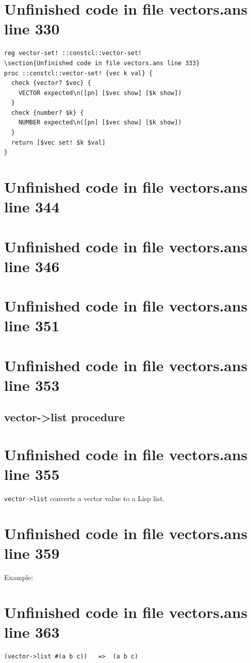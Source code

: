 \documentclass[twoside,9pt]{report}
\begin{document}
\section{Unfinished code in file vectors.ans line 330}
\begin{lstlisting}
reg vector-set! ::constcl::vector-set!
\section{Unfinished code in file vectors.ans line 333}
proc ::constcl::vector-set! {vec k val} {
  check {vector? $vec} {
    VECTOR expected\n([pn] [$vec show] [$k show])
  }
  check {number? $k} {
    NUMBER expected\n([pn] [$vec show] [$k show])
  }
  return [$vec set! $k $val]
}
\end{lstlisting}
\section{Unfinished code in file vectors.ans line 344}
\section{Unfinished code in file vectors.ans line 346}
\section{Unfinished code in file vectors.ans line 351}
\section{Unfinished code in file vectors.ans line 353}
\subsection{vector->list procedure}
\label{vector->list-procedure}
\section{Unfinished code in file vectors.ans line 355}


\texttt{vector->list} converts a vector value to a Lisp list.

\section{Unfinished code in file vectors.ans line 359}


Example:

\section{Unfinished code in file vectors.ans line 363}
\begin{verbatim}
(vector->list #(a b c))   =>  (a b c)
\end{verbatim}
\end{document}

